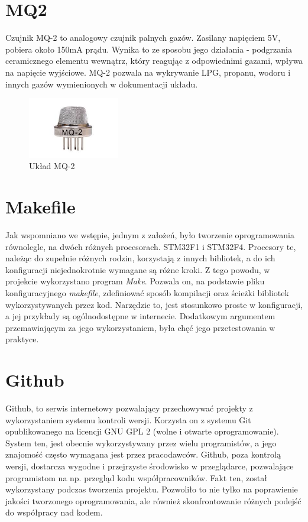 \section{MQ2}

Czujnik MQ-2 to analogowy czujnik palnych gazów. Zasilany napięciem 5V, pobiera około 150mA prądu. Wynika to ze sposobu jego działania - podgrzania ceramicznego elementu wewnątrz, który reagując z odpowiednimi gazami, wpływa na napięcie wyjściowe. MQ-2 pozwala na wykrywanie LPG, propanu, wodoru i innych gazów wymienionych w dokumentacji układu\cite{mq2_datasheet}.
\begin{figure}[H]
    \centering
    \includegraphics[width=4cm]{Graphics/mq2_img.png}
    \caption{Układ MQ-2\cite{bmp_mouser}}
    \label{img:mq_img}
\end{figure}

\section{Makefile}
Jak wspomniano we wstępie, jednym z założeń, było tworzenie oprogramowania równolegle, na dwóch różnych procesorach. STM32F1 i STM32F4. Procesory te, należąc do zupełnie różnych rodzin, korzystają z innych bibliotek, a do ich konfiguracji niejednokrotnie wymagane są różne kroki. Z tego powodu, w projekcie wykorzystano program \emph{Make}. Pozwala on, na podstawie pliku konfiguracyjnego \emph{makefile}, zdefiniować sposób kompilacji oraz ścieżki bibliotek wykorzystywanych przez kod. Narzędzie to, jest stosunkowo proste w konfiguracji, a jej przykłady są ogólnodostępne w internecie. Dodatkowym argumentem przemawiającym za jego wykorzystaniem, była chęć jego przetestowania w praktyce.

\section{Github}
Github, to serwis internetowy pozwalający przechowywać projekty z wykorzystaniem systemu kontroli wersji. Korzysta on z systemu Git opublikowanego na licencji GNU GPL 2 (wolne i otwarte oprogramowanie). System ten, jest obecnie wykorzystywany przez wielu programistów, a jego znajomość często wymagana jest przez pracodawców. Github, poza kontrolą wersji, dostarcza wygodne i przejrzyste środowisko w przeglądarce, pozwalające programistom na np. przegląd kodu współpracowników. Fakt ten, został wykorzystany podczas tworzenia projektu. Pozwoliło to nie tylko na poprawienie jakości tworzonego oprogramowania, ale również skonfrontowanie różnych podejść do współpracy nad kodem.
